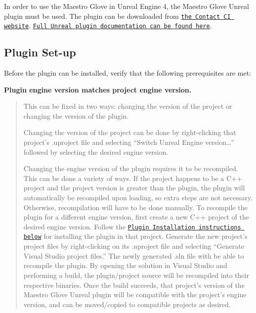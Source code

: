 In order to use the Maestro Glove in Unreal Engine 4, the Maestro Glove Unreal plugin must be used. The plugin can be downloaded from \href{https://contactci.co}{\tt the Contact CI website}. \href{https://docs.unrealengine.com/latest/INT/Programming/Plugins/}{\tt Full Unreal plugin documentation can be found here}.

\subsection*{Plugin Set-\/up}

Before the plugin can be installed, verify that the following prerequisites are met\+:


\begin{DoxyItemize}
\item {\bfseries Plugin engine version matches project engine version.} \begin{quote}
This can be fixed in two ways\+: changing the version of the project or changing the version of the plugin.

Changing the version of the project can be done by right-\/clicking that project’s {\ttfamily .uproject} file and selecting “\+Switch Unreal Engine version…” followed by selecting the desired engine version.

Changing the engine version of the plugin requires it to be recompiled. This can be done a variety of ways. If the project happens to be a C++ project and the project version is greater than the plugin, the plugin will automatically be recompiled upon loading, so extra steps are not necessary. Otherwise, recompilation will have to be done manually. To recompile the plugin for a different engine version, first create a new C++ project of the desired engine version. Follow the \href{#plugin-installation}{\tt Plugin Installation instructions below} for installing the plugin in that project. Generate the new project’s project files by right-\/clicking on its {\ttfamily .uproject} file and selecting “\+Generate Visual Studio project files.\+” The newly generated {\ttfamily .sln} file with be able to recompile the plugin. By opening the solution in Visual Studio and performing a build, the plugin/project source will be recompiled into their respective binaries. Once the build succeeds, that project’s version of the Maestro Glove Unreal plugin will be compatible with the project’s engine version, and can be moved/copied to compatible projects as desired. \end{quote}


\end{DoxyItemize}
